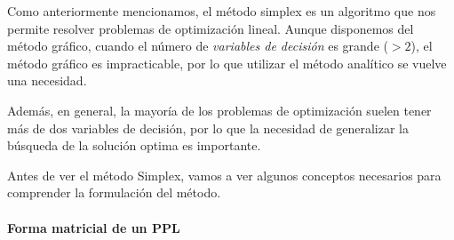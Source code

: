 Como anteriormente mencionamos, el método simplex es un algoritmo que nos permite resolver problemas de optimización lineal. Aunque disponemos del método gráfico, cuando el número de \textit{variables de decisión} es grande (\(> 2\)), el método gráfico es impracticable, por lo que utilizar el método analítico se vuelve una necesidad.

Además, en general, la mayoría de los problemas de optimización suelen tener más de dos variables de decisión, por lo que la necesidad de generalizar la búsqueda de la solución optima es importante.

Antes de ver el método Simplex, vamos a ver algunos conceptos necesarios para comprender la formulación del método.

\paragraph{Forma matricial de un PPL}

